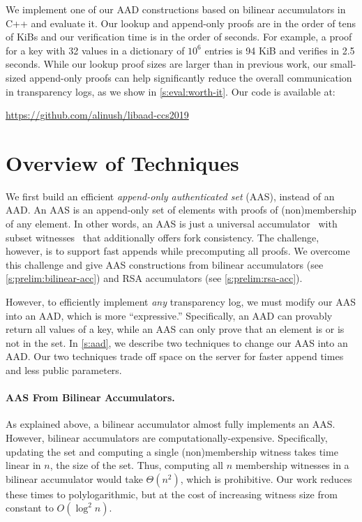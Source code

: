 We implement one of our AAD constructions based on bilinear accumulators in C++ and evaluate it.
Our lookup and append-only proofs are in the order of tens of KiBs and our verification time is in the order of seconds.
For example, a proof for a key with 32 values in a dictionary of $10^6$ entries is 94 KiB and verifies in 2.5 seconds.
While our lookup proof sizes are larger than in previous work, our small-sized append-only proofs can help significantly reduce the overall communication in transparency logs, as we show in \cref{s:eval:worth-it}.
Our code is available at:
\begin{center}
    \url{https://github.com/alinush/libaad-ccs2019}
\end{center}


\section{Overview of Techniques}
\label{s:intro:overview-techniques}
We first build an efficient \textit{append-only authenticated set} (AAS), instead of an AAD.
An AAS is an append-only set of elements with proofs of (non)membership of any element.
In other words, an AAS is just a universal accumulator~\cite{LLX07} with subset witnesses~\cite{PTT11} that additionally offers fork consistency.
The challenge, however, is to support fast appends while precomputing all proofs.
We overcome this challenge and give AAS constructions from bilinear accumulators (see \cref{s:prelim:bilinear-acc}) and RSA accumulators (see \cref{s:prelim:rsa-acc}).

However, to efficiently implement \textit{any} transparency log, we must modify our AAS into an AAD, which is more ``expressive.''
Specifically, an AAD can provably return all values of a key, while an AAS can only prove that an element is or is not in the set.
In \cref{s:aad}, we describe two techniques to change our AAS into an AAD.
Our two techniques trade off space on the server for faster append times and less public parameters.

\paragraph{AAS From Bilinear Accumulators.}
As explained above, a bilinear accumulator almost fully implements an AAS.
However, bilinear accumulators are computationally-expensive.
Specifically, updating the set and computing a single (non)membership witness takes time linear in $n$, the size of the set.
Thus, computing all $n$ membership witnesses in a bilinear accumulator would take $\Theta(n^2)$, which is prohibitive.
Our work reduces these times to polylogarithmic, but at the cost of increasing witness size from constant to $O(\log^2{n})$.

